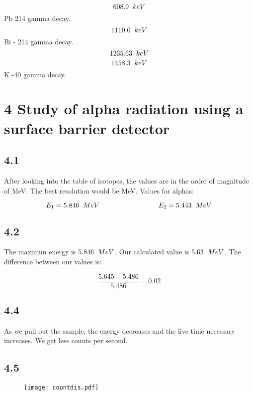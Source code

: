 \documentclass[a4paper,12pt]{article}
\begin{document}
$$608.9 \hspace{0.2cm} keV $$ Pb 214 gamma decay.
$$1119.0 \hspace{0.2cm} keV $$ Bi - 214 gamma decay.
$$1235.63 \hspace{0.2cm} keV $$ 
$$1458.3 \hspace{0.2cm}  keV$$ K -40 gamma decay.




\section{4 Study of alpha radiation using a surface barrier detector}

\subsection{4.1}

After looking into the table of isotopes, the values are in the order of magnitude of MeV. The best resolution would be MeV. Values for alphas: 

$$E_1 = 5.846 \hspace{0.2cm} MeV \hspace{3cm} E_2 = 5.443 \hspace{0.2cm} MeV$$

\subsection{4.2}

The maximun energy is $5.846 \hspace{0.2cm} MeV$. Our calculated value is $5.63 \hspace{0.2cm} MeV$. The difference between our values is: 

$$\frac{5.645-5.486}{5.486} = 0.02$$

\subsection{4.4}

As we pull out the sample, the energy decreases and the live time necessary increases. We get less counts per second.

\subsection{4.5}

\begin{figure}[H]
\centering
\label{fig:withouta}
\texttt{[image: countdis.pdf]}
\end{figure}
\end{document}
